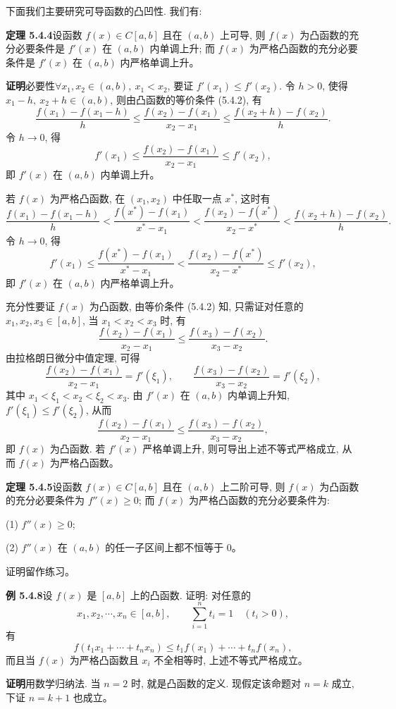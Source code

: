 \documentclass[UTF8, 12pt, fontset=fandol, oneside]{ctexart}
\begin{document}
下面我们主要研究可导函数的凸凹性. 我们有:

\noindent\textbf{定理 5.4.4}\quad 设函数 $f(x)\in C[a,b]$ 且在 $(a,b)$ 上可导, 则 $f(x)$ 为凸函数的充分必要条件是 $f'(x)$ 在 $(a,b)$ 内单调上升; 而 $f(x)$ 为严格凸函数的充分必要条件是 $f'(x)$ 在 $(a,b)$ 内严格单调上升。

\noindent\textbf{证明}\quad 必要性\quad $\forall x_1,x_2\in(a,b),\ x_1<x_2$, 要证 $f'(x_1)\le f'(x_2)$. 令 $h>0$, 使得 $x_1-h,\ x_2+h\in(a,b)$, 则由凸函数的等价条件 (5.4.2), 有
\[
  \frac{f(x_1)-f(x_1-h)}{h}
  \le
  \frac{f(x_2)-f(x_1)}{x_2-x_1}
  \le
  \frac{f(x_2+h)-f(x_2)}{h}.
\]
令 $h\to0$, 得
\[
  f'(x_1)\le\frac{f(x_2)-f(x_1)}{x_2-x_1}\le f'(x_2),
\]
即 $f'(x)$ 在 $(a,b)$ 内单调上升。

若 $f(x)$ 为严格凸函数, 在 $(x_1,x_2)$ 中任取一点 $x^*$, 这时有
\[
  \frac{f(x_1)-f(x_1-h)}{h}
  <
  \frac{f(x^*)-f(x_1)}{x^*-x_1}
  <
  \frac{f(x_2)-f(x^*)}{x_2-x^*}
  <
  \frac{f(x_2+h)-f(x_2)}{h}.
\]
令 $h\to0$, 得
\[
  f'(x_1)\le
  \frac{f(x^*)-f(x_1)}{x^*-x_1}
  <
  \frac{f(x_2)-f(x^*)}{x_2-x^*}
  \le f'(x_2),
\]
即 $f'(x)$ 在 $(a,b)$ 内严格单调上升。

充分性\quad 要证 $f(x)$ 为凸函数, 由等价条件 (5.4.2) 知, 只需证对任意的 $x_1,x_2,x_3\in[a,b]$, 当 $x_1<x_2<x_3$ 时, 有
\[
  \frac{f(x_2)-f(x_1)}{x_2-x_1}
  \le
  \frac{f(x_3)-f(x_2)}{x_3-x_2}.
\]
由拉格朗日微分中值定理, 可得
\[
  \frac{f(x_2)-f(x_1)}{x_2-x_1}=f'(\xi_1),\qquad
  \frac{f(x_3)-f(x_2)}{x_3-x_2}=f'(\xi_2),
\]
其中 $x_1<\xi_1<x_2<\xi_2<x_3$. 由 $f'(x)$ 在 $(a,b)$ 内单调上升知, $f'(\xi_1)\le f'(\xi_2)$, 从而
\[
  \frac{f(x_2)-f(x_1)}{x_2-x_1}
  \le
  \frac{f(x_3)-f(x_2)}{x_3-x_2},
\]
即 $f(x)$ 为凸函数. 若 $f'(x)$ 严格单调上升, 则可导出上述不等式严格成立, 从而 $f(x)$ 为严格凸函数。

\noindent\textbf{定理 5.4.5}\quad 设函数 $f(x)\in C[a,b]$ 且在 $(a,b)$ 上二阶可导, 则 $f(x)$ 为凸函数的充分必要条件为 $f''(x)\ge0$; 而 $f(x)$ 为严格凸函数的充分必要条件为:

(1) $f''(x)\ge0$;

(2) $f''(x)$ 在 $(a,b)$ 的任一子区间上都不恒等于 $0$。

证明留作练习。

\noindent\textbf{例 5.4.8}\quad 设 $f(x)$ 是 $[a,b]$ 上的凸函数. 证明: 对任意的
\[
  x_1,x_2,\cdots,x_n\in[a,b],\qquad
  \sum_{i=1}^n t_i=1\quad (t_i>0),
\]
有
\[
  f(t_1x_1+\cdots+t_nx_n)\le t_1f(x_1)+\cdots+t_nf(x_n),
\]
而且当 $f(x)$ 为严格凸函数且 $x_i$ 不全相等时, 上述不等式严格成立。

\noindent\textbf{证明}\quad 用数学归纳法. 当 $n=2$ 时, 就是凸函数的定义. 现假定该命题对 $n=k$ 成立, 下证 $n=k+1$ 也成立。
\end{document}
